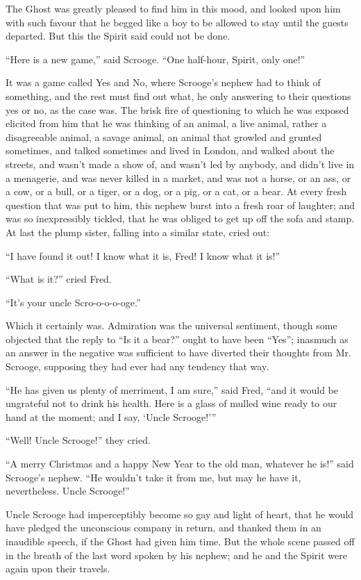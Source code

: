 \documentclass[paper=5.5in:8.5in,BCOR=15mm,twoside,DIV=15,headinclude=off,12pt,chapterprefix=off,openany,headings=huge]{scrbook} %
\begin{document}
The Ghost was greatly pleased to find him in this mood, and looked upon him with such favour that he begged like a boy to be allowed to stay until the guests departed. But this the Spirit said could not be done.

\enquote{Here is a new game,} said Scrooge. \enquote{One half-hour, Spirit, only one!}

It was a game called Yes and No, where Scrooge's nephew had to think of something, and the rest must find out what, he only answering to their questions yes or no, as the case was. The brisk fire of questioning to which he was exposed elicited from him that he was thinking of an animal, a live animal, rather a disagreeable animal, a savage animal, an animal that growled and grunted sometimes, and talked sometimes and lived in London, and walked about the streets, and wasn't made a show of, and wasn't led by anybody, and didn't live in a menagerie, and was never killed in a market, and was not a horse, or an ass, or a cow, or a bull, or a tiger, or a dog, or a pig, or a cat, or a bear. At every fresh question that was put to him, this nephew burst into a fresh roar of laughter; and was so inexpressibly tickled, that he was obliged to get up off the sofa and stamp. At last the plump sister, falling into a similar state, cried out:

\enquote{I have found it out! I know what it is, Fred! I know what it is!}

\enquote{What is it?} cried Fred.

\enquote{It's your uncle Scro-o-o-o-oge.}

Which it certainly was. Admiration was the universal sentiment, though some objected that the reply to \enquote{Is it a bear?} ought to have been \enquote{Yes}; inasmuch as an answer in the negative was sufficient to have diverted their thoughts from Mr. Scrooge, supposing they had ever had any tendency that way.

\enquote{He has given us plenty of merriment, I am sure,} said Fred, \enquote{and it would be ungrateful not to drink his health. Here is a glass of mulled wine ready to our hand at the moment; and I say, \enquote{Uncle Scrooge!}}

\enquote{Well! Uncle Scrooge!} they cried.

\enquote{A merry Christmas and a happy New Year to the old man, whatever he is!} said Scrooge's nephew. \enquote{He wouldn't take it from me, but may he have it, nevertheless. Uncle Scrooge!}

Uncle Scrooge had imperceptibly become so gay and light of heart, that he would have pledged the unconscious company in return, and thanked them in an inaudible speech, if the Ghost had given him time. But the whole scene passed off in the breath of the last word spoken by his nephew; and he and the Spirit were again upon their travels.
\end{document}
